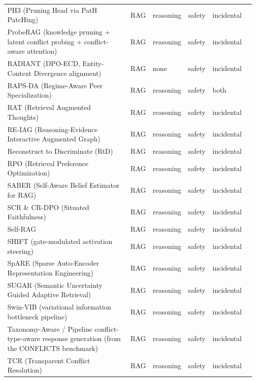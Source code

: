 \begin{longtable}{@{}p{}lllll@{}}
PH3 (Pruning Head via PatH PatcHing) & RAG & reasoning & safety & incidental & \cite{jin-2024-cutting} \\
ProbeRAG (knowledge pruning + latent conflict probing + conflict-aware attention) & RAG & reasoning & safety & incidental & \cite{gao-2025-blackbox} \\
RADIANT (DPO-ECD, Entity-Context Divergence alignment) & RAG & none & safety & incidental & \cite{rawte-2025-radiant} \\
RAPS-DA (Regime-Aware Peer Specialization) & RAG & reasoning & safety & both & \cite{wang-2026-regimeaware} \\
RAT (Retrieval Augmented Thoughts) & RAG & reasoning & safety & incidental & \cite{wang-2024-rat} \\
RE-IAG (Reasoning-Evidence Interactive Augmented Graph) & RAG & reasoning & safety & incidental & \cite{sui-2026-decomposition} \\
Reconstruct to Discriminate (RtD) & RAG & reasoning & safety & incidental & \cite{peng-2025-misinformation} \\
RPO (Retrieval Preference Optimization) & RAG & reasoning & safety & incidental & \cite{yan-2025-rpo} \\
SABER (Self-Aware Belief Estimator for RAG) & RAG & reasoning & safety & incidental & \cite{zhu-2026-trust} \\
SCR \& CR-DPO (Situated Faithfulness) & RAG & reasoning & safety & incidental & \cite{huang-2024-trust} \\
Self-RAG & RAG & reasoning & safety & incidental & \cite{asai-2023-selfrag} \\
SHIFT (gate-modulated activation steering) & RAG & reasoning & safety & incidental & \cite{li-2026-shift} \\
SpARE (Sparse Auto-Encoder Representation Engineering) & RAG & reasoning & safety & incidental & \cite{zhao-2024-steering} \\
SUGAR (Semantic Uncertainty Guided Adaptive Retrieval) & RAG & reasoning & safety & incidental & \cite{zubkova-2025-sugar} \\
Swin-VIB (variational information bottleneck pipeline) & RAG & reasoning & safety & incidental & \cite{wang-2025-accommodate} \\
Taxonomy-Aware / Pipeline conflict-type-aware response generation (from the CONFLICTS benchmark) & RAG & reasoning & safety & incidental & \cite{cattan-2025-dragged} \\
TCR (Transparent Conflict Resolution) & RAG & reasoning & safety & incidental & \cite{ye-2026-seeing} \\

\end{longtable}
